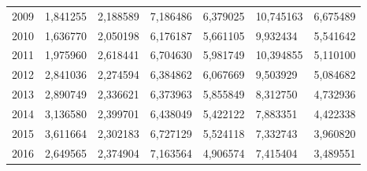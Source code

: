 \begin{table}
\begin{tabular}{p{1cm}p{2cm}p{2cm}p{2cm}p{2cm}p{2cm}p{2cm}}
 2009 &                                 1,841255 & 2,188589 &                      7,186486 &               6,379025 &                           10,745163 &                                   6,675489 \\
 2010 &                                 1,636770 & 2,050198 &                      6,176187 &               5,661105 &                            9,932434 &                                   5,541642 \\
 2011 &                                 1,975960 & 2,618441 &                      6,704630 &               5,981749 &                           10,394855 &                                   5,110100 \\
 2012 &                                 2,841036 & 2,274594 &                      6,384862 &               6,067669 &                            9,503929 &                                   5,084682 \\
 2013 &                                 2,890749 & 2,336621 &                      6,373963 &               5,855849 &                            8,312750 &                                   4,732936 \\
 2014 &                                 3,136580 & 2,399701 &                      6,438049 &               5,422122 &                            7,883351 &                                   4,422338 \\
 2015 &                                 3,611664 & 2,302183 &                      6,727129 &               5,524118 &                            7,332743 &                                   3,960820 \\
 2016 &                                 2,649565 & 2,374904 &                      7,163564 &               4,906574 &                            7,415404 &                                   3,489551 \\
\bottomrule
\end{tabular}
\end{table}
